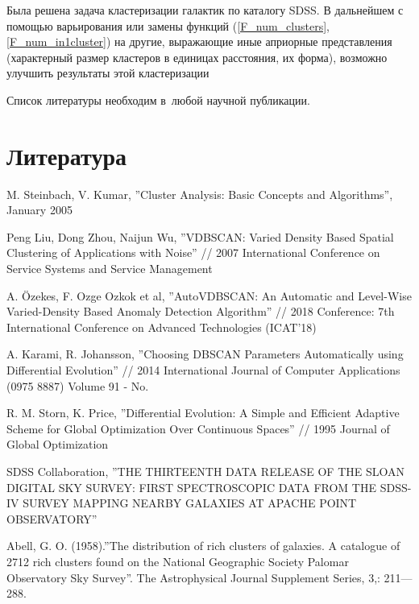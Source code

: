 \documentclass[12pt,fleqn]{article}
\begin{document}
Была решена задача кластеризации галактик по каталогу SDSS. 
В дальнейшем с помощью варьирования или замены функций (\ref{F_num_clusters}, \ref{F_num_in1cluster}) на другие, выражающие иные априорные представления (характерный размер кластеров в единицах расстояния, их форма), возможно улучшить результаты этой кластеризации

\newpage
Список литературы необходим в~любой научной публикации.

\section{Литература}

\begin{thebibliography}{2}

M. Steinbach, V. Kumar, ''Cluster Analysis: Basic Concepts and Algorithms'', January 2005

Peng Liu, Dong Zhou, Naijun Wu,  ''VDBSCAN: Varied Density Based Spatial Clustering of Applications with Noise'' // 2007 International Conference on Service Systems and Service Management

A. Özekes, F. Ozge Ozkok et al, ''AutoVDBSCAN: An Automatic and Level-Wise Varied-Density Based Anomaly Detection Algorithm'' //  2018
Conference: 7th International Conference on Advanced Technologies (ICAT'18)

A. Karami, R. Johansson, ''Choosing DBSCAN Parameters Automatically using
Differential Evolution'' // 2014 International Journal of Computer Applications (0975 8887) Volume 91 - No.

R. M. Storn, K. Price, ''Differential Evolution: A Simple and Efficient Adaptive Scheme for Global Optimization Over Continuous Spaces'' // 1995 Journal of Global Optimization

SDSS Collaboration, ''THE THIRTEENTH DATA RELEASE OF THE SLOAN DIGITAL SKY SURVEY: FIRST SPECTROSCOPIC
DATA FROM THE SDSS-IV SURVEY MAPPING NEARBY GALAXIES AT APACHE POINT OBSERVATORY''

Abell, G. O. (1958).''The distribution of rich clusters of galaxies. A catalogue of 2712 rich clusters found on the National Geographic Society Palomar Observatory Sky Survey''. The Astrophysical Journal Supplement Series, 3,: 211—288.

\end{thebibliography}
\end{document}
